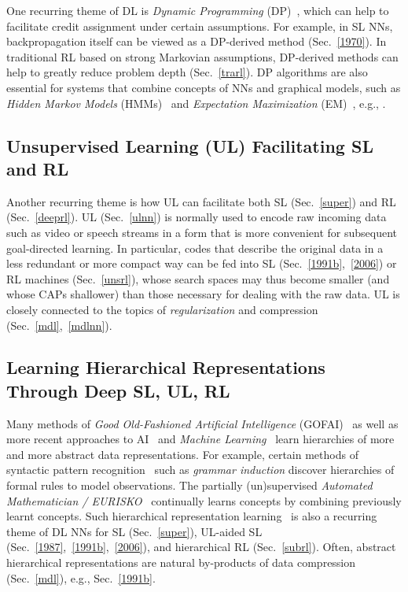 \documentclass[letterpaper]{article}
\begin{document}
\begin{CJK*}{UTF8}{gbsn}
\begin{sloppypar}
One recurring theme of DL is
{\em Dynamic Programming} (DP)~\citep{Bellman:1957},
which  can help to facilitate credit assignment
under certain assumptions. For example, 
in SL NNs, backpropagation itself can be viewed as a DP-derived method (Sec.~\ref{1970}).
In traditional RL based on strong Markovian assumptions,
DP-derived methods can help to greatly reduce problem depth (Sec.~\ref{trarl}). 
DP algorithms are also essential for systems that combine concepts of NNs and
graphical models, such as {\em Hidden Markov
Models} (HMMs)~\citep{stratonovich1960,baum1966}
and {\em Expectation Maximization} (EM)~\citep{dempster77,friedman2001}, e.g., \citep{bottou91,bengio91,bourlard+morgan:1994,baldichauvin96,jordan2001,bishop:2006,hastie2009,domingos2011,dahl2012,speech2012,diwu2014}.



\subsection{Unsupervised Learning (UL) Facilitating SL and RL}
\label{ul}

Another recurring theme is how 
UL 
can facilitate both SL (Sec.~\ref{super}) and RL (Sec.~\ref{deeprl}).
UL (Sec.~\ref{ulnn}) is normally used to 
encode raw incoming data such as video or speech streams
in a form that is more convenient for subsequent goal-directed learning.
In particular, codes that describe the original data in a less redundant or more compact way
can be fed into SL (Sec.~\ref{1991b},~\ref{2006})
or RL machines (Sec.~\ref{unsrl}), whose
search spaces may thus become smaller 
(and whose CAPs shallower)
than those necessary for dealing with the raw data.
UL is closely 
connected to the topics of 
{\em regularization} 
and compression (Sec.~\ref{mdl},~\ref{mdlnn}).

\subsection{Learning Hierarchical Representations Through Deep SL, UL, RL}
\label{hie}

Many methods of 
{\em  Good Old-Fashioned Artificial Intelligence} (GOFAI)~\citep{Nilsson:80} 
as well as more recent approaches to AI~\citep{russell1995} and {\em Machine Learning}~\citep{Mitchell:97} 
learn hierarchies of more and more abstract data representations.
For example, certain methods of syntactic pattern recognition~\citep{Fu:77} such as
{\em grammar induction} discover hierarchies of  
formal rules to model observations.
The partially (un)supervised
{\em Automated Mathematician / EURISKO}~\citep{Lenat:83,Lenat:84} continually learns   
concepts by combining previously learnt concepts.
Such hierarchical representation learning~\citep{Ring:94,bengio2013tpami,lideng2014} is also a recurring theme of
DL NNs for SL (Sec.~\ref{super}), 
UL-aided SL (Sec.~\ref{1987},~\ref{1991b},~\ref{2006}), 
and hierarchical RL (Sec.~\ref{subrl}).
Often, abstract hierarchical representations are natural by-products of
data compression (Sec.~\ref{mdl}), e.g., Sec.~\ref{1991b}. 



\end{sloppypar}
\end{CJK*}
\end{document}
